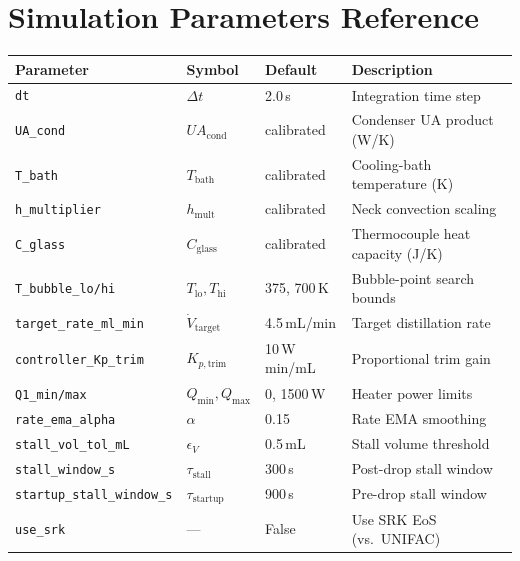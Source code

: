 \documentclass[11pt,letterpaper]{article}
\newcommand{\dt}{\Delta t}
\begin{document}
\section{Simulation Parameters Reference}
\label{sec:params}

\begin{center}
\begin{tabular}{llll}
\toprule
Parameter & Symbol & Default & Description \\
\midrule
\texttt{dt} & $\dt$ & 2.0\,s & Integration time step \\
\texttt{UA\_cond} & $UA_{\mathrm{cond}}$ & calibrated & Condenser UA product (W/K) \\
\texttt{T\_bath} & $T_{\mathrm{bath}}$ & calibrated & Cooling-bath temperature (K) \\
\texttt{h\_multiplier} & $h_{\mathrm{mult}}$ & calibrated & Neck convection scaling \\
\texttt{C\_glass} & $C_{\mathrm{glass}}$ & calibrated & Thermocouple heat capacity (J/K) \\
\texttt{T\_bubble\_lo/hi} & $T_{\mathrm{lo}}, T_{\mathrm{hi}}$ & 375, 700\,K & Bubble-point search bounds \\
\texttt{target\_rate\_ml\_min} & $\dot{V}_{\mathrm{target}}$ & 4.5\,mL/min & Target distillation rate \\
\texttt{controller\_Kp\_trim} & $K_{p,\mathrm{trim}}$ & 10\,W\,min/mL & Proportional trim gain \\
\texttt{Q1\_min/max} & $Q_{\min}, Q_{\max}$ & 0, 1500\,W & Heater power limits \\
\texttt{rate\_ema\_alpha} & $\alpha$ & 0.15 & Rate EMA smoothing \\
\texttt{stall\_vol\_tol\_mL} & $\epsilon_V$ & 0.5\,mL & Stall volume threshold \\
\texttt{stall\_window\_s} & $\tau_{\mathrm{stall}}$ & 300\,s & Post-drop stall window \\
\texttt{startup\_stall\_window\_s} & $\tau_{\mathrm{startup}}$ & 900\,s & Pre-drop stall window \\
\texttt{use\_srk} & --- & False & Use SRK EoS (vs.\ UNIFAC) \\
\bottomrule
\end{tabular}
\end{center}
\end{document}
